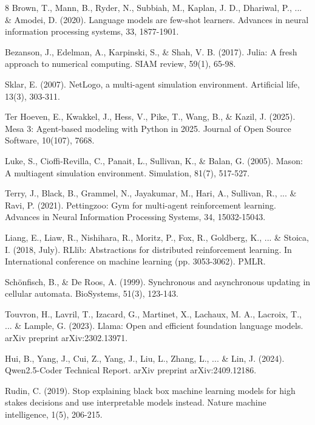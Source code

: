 \documentclass[runningheads]{llncs}
\begin{document}
\begin{thebibliography}{8}
Brown, T., Mann, B., Ryder, N., Subbiah, M., Kaplan, J. D., Dhariwal, P., ... \& Amodei, D. (2020). Language models are few-shot learners. Advances in neural information processing systems, 33, 1877-1901.

Bezanson, J., Edelman, A., Karpinski, S., \& Shah, V. B. (2017). Julia: A fresh approach to numerical computing. SIAM review, 59(1), 65-98. 

Sklar, E. (2007). NetLogo, a multi-agent simulation environment. Artificial life, 13(3), 303-311. 

Ter Hoeven, E., Kwakkel, J., Hess, V., Pike, T., Wang, B., \& Kazil, J. (2025). Mesa 3: Agent-based modeling with Python in 2025. Journal of Open Source Software, 10(107), 7668. 

Luke, S., Cioffi-Revilla, C., Panait, L., Sullivan, K., \& Balan, G. (2005). Mason: A multiagent simulation environment. Simulation, 81(7), 517-527. 

Terry, J., Black, B., Grammel, N., Jayakumar, M., Hari, A., Sullivan, R., ... \& Ravi, P. (2021). Pettingzoo: Gym for multi-agent reinforcement learning. Advances in Neural Information Processing Systems, 34, 15032-15043.

Liang, E., Liaw, R., Nishihara, R., Moritz, P., Fox, R., Goldberg, K., ... \& Stoica, I. (2018, July). RLlib: Abstractions for distributed reinforcement learning. In International conference on machine learning (pp. 3053-3062). PMLR. 

Schönfisch, B., \& De Roos, A. (1999). Synchronous and asynchronous updating in cellular automata. BioSystems, 51(3), 123-143. 

Touvron, H., Lavril, T., Izacard, G., Martinet, X., Lachaux, M. A., Lacroix, T., ... \& Lample, G. (2023). Llama: Open and efficient foundation language models. arXiv preprint arXiv:2302.13971. 

Hui, B., Yang, J., Cui, Z., Yang, J., Liu, L., Zhang, L., ... \& Lin, J. (2024). Qwen2.5-Coder Technical Report. arXiv preprint arXiv:2409.12186. 

Rudin, C. (2019). Stop explaining black box machine learning models for high stakes decisions and use interpretable models instead. Nature machine intelligence, 1(5), 206-215. 


\end{thebibliography}
\end{document}
